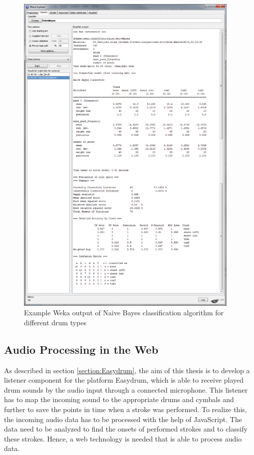 \begin{figure}[h]
	\centering
	\includegraphics[height=16cm]{images/weka.png}
	\caption{Example Weka output of Naive Bayes classification algorithm for different drum types}
	\label{fig:weka}
\end{figure}


\subsection{Audio Processing in the Web}

As described in section \ref{section:Easydrum}, the aim of this thesis is to develop a listener component for the platform Easydrum, which is able to receive played drum sounds by the audio input through a connected microphone. This listener has to map the incoming sound to the appropriate drums and cymbals and further to save the points in time when a stroke was performed. To realize this, the incoming audio data has to be processed with the help of JavaScript. The data need to be analyzed to find the onsets of performed strokes and to classify these strokes. Hence, a web technology is needed that is able to process audio data.

